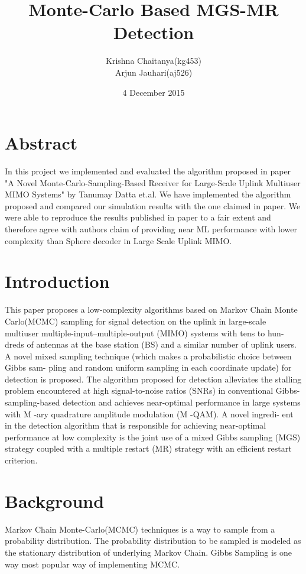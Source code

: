 \documentclass{article}
\title{Monte-Carlo Based MGS-MR Detection}
\author{Krishna Chaitanya(kg453) \\ Arjun Jauhari(aj526)}
\date{4 December 2015}
\begin{document}
\maketitle

\section*{Abstract}
In this project we implemented and evaluated the algorithm 
proposed in paper "A Novel Monte-Carlo-Sampling-Based Receiver 
for Large-Scale Uplink Multiuser MIMO Systems" by Tanumay Datta et.al. 
We have implemented the algorithm proposed and compared our simulation results
with the one claimed in paper. We were able to reproduce the results published in
paper to a fair extent and therefore agree with authors claim of providing near ML performance
with lower complexity than Sphere decoder in Large Scale Uplink MIMO. \\

\section*{Introduction}
This paper proposes a low-complexity algorithms based on Markov Chain
Monte Carlo(MCMC) sampling for signal detection
on the uplink in large-scale multiuser
multiple-input–multiple-output (MIMO) systems with tens to hun-
dreds of antennas at the base station (BS) and a similar number of
uplink users. A novel mixed sampling
technique (which makes a probabilistic choice between Gibbs sam-
pling and random uniform sampling in each coordinate update)
for detection is proposed. The algorithm proposed for detection
alleviates the stalling problem encountered at high signal-to-noise
ratios (SNRs) in conventional Gibbs-sampling-based detection and
achieves near-optimal performance in large systems with M -ary
quadrature amplitude modulation (M -QAM). A novel ingredi-
ent in the detection algorithm that is responsible for achieving
near-optimal performance at low complexity is the joint use of
a mixed Gibbs sampling (MGS) strategy coupled with a multiple
restart (MR) strategy with an efficient restart criterion. \\

\section*{Background}
Markov Chain Monte-Carlo(MCMC) techniques is a way to sample from a probability
distribution. The probability distribution to be sampled is modeled as the stationary 
distribution of underlying Markov Chain. Gibbs Sampling is one way most popular way
of implementing MCMC. \\
\end{document}
